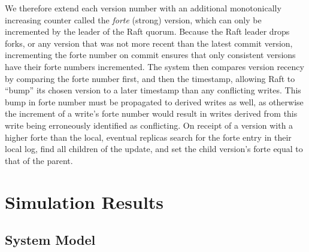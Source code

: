 \documentclass[10pt,conference,letterpaper]{IEEEtran}
\begin{document}
We therefore extend each version number with an additional monotonically
increasing counter called the \textit{forte} (strong) version, which can only
be incremented by the leader of the Raft quorum.
Because the Raft leader drops forks, or any version that was not more recent
than the latest commit version, incrementing the forte number on commit
ensures that only consistent versions have their forte numbers incremented.
The system then compares version recency by comparing the forte
number first, and then the timestamp, allowing Raft to ``bump'' its chosen
version to a later timestamp than any conflicting writes.
This bump in forte number must be propagated to derived writes as well, as
otherwise the increment of a write's forte number would result in writes
derived from this write being erroneously identified as conflicting.
On receipt of a version with a higher forte than the local, eventual replicas
search for the forte entry in their local log, find all children of the
update, and set the child version's forte equal to that of the parent.


\section{Simulation Results}
\label{sec:results}

\subsection{System Model}
\end{document}
